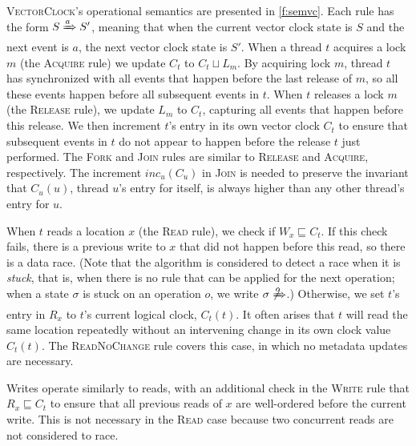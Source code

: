 \documentclass[preprint, 10pt]{sigplanconf}
\newcommand{\Tid}{t}
\newcommand{\TidU}{u}
\newcommand{\Address}{x}
\newcommand{\Lock}{m}
\newcommand{\VCFont}{}
\newcommand{\ThreadVC}[1]{\VCFont{C}_{#1}}
\newcommand{\LockVC}[1]{\VCFont{L}_{#1}}
\newcommand{\ReadVC}[1]{\VCFont{R}_{#1}}
\newcommand{\WriteVC}[1]{\VCFont{W}_{#1}}
\newcommand{\VCalg}{\textsc{VectorClock}\xspace}
\newcommand{\Rule}[1]{\textsc{#1}}
\newcommand{\VCMax}{\sqcup}
\newcommand{\VCCompare}{\sqsubseteq}
\begin{document}
\VCalg's operational semantics are presented in \autoref{f:semvc}. Each rule has the form $S \xRightarrow{a} S'$, meaning that when the current vector clock state is $S$ and the next event is $a$, the next vector clock state is $S'$. When a thread $\Tid$ acquires a lock $\Lock$ (the \Rule{Acquire} rule) we update $\ThreadVC{\Tid}$ to $\ThreadVC{\Tid} \VCMax \LockVC{\Lock}$.  By acquiring lock $\Lock$, thread $\Tid$ has synchronized with all events that happen before the last release of $\Lock$, so all these events happen before all subsequent events in $\Tid$.  When $\Tid$ releases a lock $\Lock$ (the \Rule{Release} rule), we update $\LockVC{\Lock}$ to $\ThreadVC{\Tid}$, capturing all events that happen before this release.  We then increment $\Tid$'s entry in its own vector clock $\ThreadVC{\Tid}$ to ensure that subsequent events in $\Tid$ do not appear to happen before the release $\Tid$ just performed.  The \Rule{Fork} and \Rule{Join} rules are similar to \Rule{Release} and \Rule{Acquire}, respectively. The increment $\mathit{inc}_u(C_u)$ in \Rule{Join} is needed to preserve the invariant that $\ThreadVC{\TidU}(u)$, thread $\TidU$'s entry for itself, is always higher than any other thread's entry for $\TidU$.

When $\Tid$ reads a location $\Address$ (the \Rule{Read} rule), we check if $\WriteVC{\Address} \VCCompare \ThreadVC{\Tid}$.  If this check fails, there is a previous write to $\Address$ that did not happen before this read, so there is a data race. (Note that the algorithm is considered to detect a race when it is \emph{stuck}, that is, when there is no rule that can be applied for the next operation; when a state $\sigma$ is stuck on an operation $o$, we write $\sigma \not\xRightarrow{o}$.) Otherwise, we set $\Tid$'s entry in $\ReadVC{\Address}$ to $\Tid$'s current logical clock, $\ThreadVC{\Tid}(\Tid)$.  It often arises that $\Tid$ will read the same location repeatedly without an intervening change in its own clock value $\ThreadVC{\Tid}(\Tid)$. The \Rule{ReadNoChange} rule covers this case, in which no metadata updates are necessary.

Writes operate similarly to reads, with an additional check in the \Rule{Write} rule that $\ReadVC{\Address} \VCCompare \ThreadVC{\Tid}$ to ensure that all previous reads of $\Address$ are well-ordered before the current write. This is not necessary in the \Rule{Read} case because two concurrent reads are not considered to race.

\end{document}
